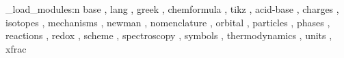 %
%
%
%
%

\chemmacros_load_modules:n
  {
     base ,
     lang ,
     greek ,
     chemformula ,
     tikz ,
     acid-base ,
     charges ,
     isotopes ,
     mechanisms ,
     newman ,
     nomenclature ,
     orbital ,
     particles ,
     phases ,
     reactions ,
     redox ,
     scheme ,
     spectroscopy ,
     symbols ,
     thermodynamics ,
     units ,
     xfrac
  }


